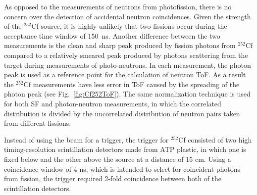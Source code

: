 As opposed to the measurements of neutrons from photofission, there is no concern over the detection of accidental neutron coincidences.
Given the strength of the $^{252}$Cf source, it is highly unlikely that two fissions occur during the acceptance time window of 150~ns.
Another difference between the two measurements is the clean and sharp peak produced by fission photons from $^{252}$Cf compared to a relatively smeared peak produced by photons scattering from the target during measurements of photo-neutrons.
In each measurement, the photon peak is used as a reference point for the calculation of neutron ToF.
As a result the $^{252}$Cf measurements have less error in ToF caused by the spreading of the photon peak (see Fig.~\ref{fig:Cf252ToF}).
The same normalization technique is used for both SF and photon-neutron measurements, in which the correlated distribution is divided by the uncorrelated distribution of neutron pairs taken from different fissions.

Instead of using the beam for a trigger, the trigger for $^{252}$Cf consisted of two high timing-resolution scintillation detectors made from ATP plastic, in which one is fixed below and the other above the source at a distance of 15 cm.
Using a coincidence window of 4 ns, which is intended to select for coincident photons from fission, the trigger required 2-fold coincidence between both of the scintillation detectors.